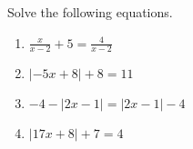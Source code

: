 \documentclass{article}
\begin{document}
\HomeworkTitle[class={College Algebra}, number={1}, name={Linear Equations}]

Solve the following equations.

\begin{enumerate}
\item $\displaystyle\frac{x}{x - 2} + 5 = \displaystyle\frac{4}{x - 2}$ \vspace{5cm}

\item $|-5x + 8| + 8 = 11$ \vspace{5cm}

\item $-4 - |2x - 1| = |2x - 1| - 4$ \vspace{5cm}

\item $|17x + 8| + 7 = 4$
\end{enumerate}
\end{document}
